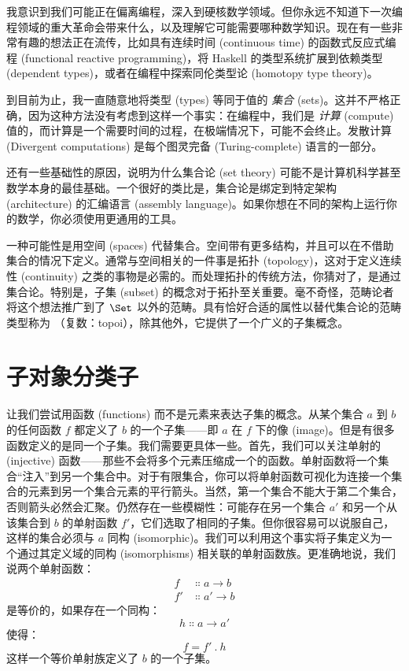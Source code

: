 
\lettrine[lhang=0.17]{我}{意识到我们可能}正在偏离编程，深入到硬核数学领域。但你永远不知道下一次编程领域的重大革命会带来什么，以及理解它可能需要哪种数学知识。现在有一些非常有趣的想法正在流传，比如具有连续时间 (continuous time) 的函数式反应式编程 (functional reactive programming)，将 Haskell 的类型系统扩展到依赖类型 (dependent types)，或者在编程中探索同伦类型论 (homotopy type theory)。

到目前为止，我一直随意地将类型 (types) 等同于值的 \emph{集合} (sets)。这并不严格正确，因为这种方法没有考虑到这样一个事实：在编程中，我们是 \emph{计算} (compute) 值的，而计算是一个需要时间的过程，在极端情况下，可能不会终止。发散计算 (Divergent computations) 是每个图灵完备 (Turing-complete) 语言的一部分。

还有一些基础性的原因，说明为什么集合论 (set theory) 可能不是计算机科学甚至数学本身的最佳基础。一个很好的类比是，集合论是绑定到特定架构 (architecture) 的汇编语言 (assembly language)。如果你想在不同的架构上运行你的数学，你必须使用更通用的工具。

一种可能性是用空间 (spaces) 代替集合。空间带有更多结构，并且可以在不借助集合的情况下定义。通常与空间相关的一件事是拓扑 (topology)，这对于定义连续性 (continuity) 之类的事物是必需的。而处理拓扑的传统方法，你猜对了，是通过集合论。特别是，子集 (subset) 的概念对于拓扑至关重要。毫不奇怪，范畴论者将这个想法推广到了 $\Set$ 以外的范畴。具有恰好合适的属性以替代集合论的范畴类型称为 （复数：topoi），除其他外，它提供了一个广义的子集概念。

\section{子对象分类子}

让我们尝试用函数 (functions) 而不是元素来表达子集的概念。从某个集合 $a$ 到 $b$ 的任何函数 $f$ 都定义了 $b$ 的一个子集——即 $a$ 在 $f$ 下的像 (image)。但是有很多函数定义的是同一个子集。我们需要更具体一些。首先，我们可以关注单射的 (injective) 函数——那些不会将多个元素压缩成一个的函数。单射函数将一个集合“注入”到另一个集合中。对于有限集合，你可以将单射函数可视化为连接一个集合的元素到另一个集合元素的平行箭头。当然，第一个集合不能大于第二个集合，否则箭头必然会汇聚。仍然存在一些模糊性：可能存在另一个集合 $a'$ 和另一个从该集合到 $b$ 的单射函数 $f'$，它们选取了相同的子集。但你很容易可以说服自己，这样的集合必须与 $a$ 同构 (isomorphic)。我们可以利用这个事实将子集定义为一个通过其定义域的同构 (isomorphisms) 相关联的单射函数族。更准确地说，我们说两个单射函数：
\begin{align*}
  f  & \Colon a \to b  \\
  f' & \Colon a' \to b
\end{align*}
是等价的，如果存在一个同构：
\[h \Colon a \to a'\]
使得：
\[f = f'\ .\ h\]
这样一个等价单射族定义了 $b$ 的一个子集。


